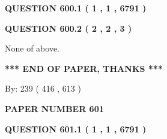 \documentclass[12pt]{article}
\begin{document}
   
 \vspace{0.2in}
 
 
 
 
   
   
  
\vspace{0.2in}
  
{\textbf{\Large{QUESTION
600.1 
 ( 1 , 1 , 6791 )
}}}
  
  
  
\vspace{0.2in}
  
{\textbf{\Large{QUESTION
600.2 
 ( 2 , 2 , 3 )
}}}
  
  
 
 
\noindent{}
 
 
 None of above.
 
 
 
 
   
   
 \vspace{0.2in}
 
   
   
   
   
\vspace{1.0in} 
{\textbf{\large{ *** END OF PAPER, THANKS *** }}} 
   
   
\hspace{1.0in} By: 
 239 ( 416 ,  613 )
   
   
   
   
\newpage 
\setcounter{page}{ 
   601001 } 
   
   
   
   
 {\textbf{ \Large{ PAPER NUMBER  601  }}}
   
   
\vspace{0.2in}
   
   
   
   
   
   
 \vspace{0.2in}
 
 
 
 
   
   
  
\vspace{0.2in}
  
{\textbf{\Large{QUESTION
601.1 
 ( 1 , 1 , 6791 )
}}}
  
  
  
\end{document}
